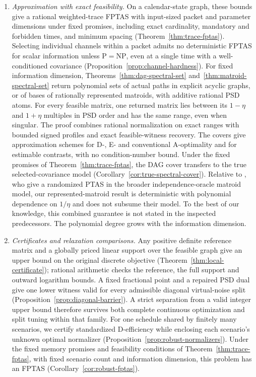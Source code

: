 \begin{enumerate}
\item \emph{Approximation with exact feasibility.} On a calendar-state graph,
these bounds give a rational weighted-trace FPTAS with input-sized packet
and parameter dimensions under fixed promises, including exact cardinality,
mandatory and forbidden times, and minimum spacing
(Theorem~\ref{thm:trace-fptas}). Selecting individual channels within a
packet admits no deterministic FPTAS for scalar information unless
$\mathrm P=\mathrm{NP}$, even at a single time with a well-conditioned
covariance (Proposition~\ref{prop:channel-hardness}). For fixed information
dimension, Theorems~\ref{thm:dag-spectral-set} and~\ref{thm:matroid-spectral-set}
return polynomial sets of actual paths in explicit acyclic graphs, or of
bases of rationally represented matroids, with additive rational PSD atoms.
For every feasible matrix, one returned matrix lies between its $1-\eta$ and
$1+\eta$ multiples in PSD order and has the same range, even when singular.
The proof combines rational normalization on exact ranges with bounded
signed profiles and exact feasible-witness recovery. The covers give
approximation schemes for D-, E- and conventional A-optimality and for
estimable contrasts, with no condition-number bound. Under the fixed
promises of Theorem~\ref{thm:trace-fptas}, the DAG cover transfers to the
true selected-covariance model (Corollary~\ref{cor:true-spectral-cover}).
Relative to \citet{Brown2024}, who give a randomized PTAS in the broader
independence-oracle matroid model, our represented-matroid result is
deterministic with polynomial dependence on $1/\eta$ and does not subsume
their model. To the best of our knowledge, this combined guarantee is not
stated in the inspected predecessors. The polynomial degree grows with the
information dimension.

\item \emph{Certificates and relaxation comparisons.} Any positive definite
reference matrix and a globally priced linear support over the feasible
graph give an upper bound on the original discrete objective
(Theorem~\ref{thm:local-certificate}); rational arithmetic checks the
reference, the full support and outward logarithm bounds. A fixed fractional
point and a repaired PSD dual give one lower witness valid for every
admissible diagonal virtual-noise split
(Proposition~\ref{prop:diagonal-barrier}).
A strict separation from a valid integer upper bound therefore survives both
complete continuous optimization and split tuning within that family. For
one schedule shared by finitely many scenarios, we certify standardized
D-efficiency while enclosing each scenario's unknown optimal normalizer
(Proposition~\ref{prop:robust-normalizers}). Under the fixed memory
promises and feasibility conditions of Theorem~\ref{thm:trace-fptas}, with
fixed scenario count and information dimension, this problem has an FPTAS
(Corollary~\ref{cor:robust-fptas}).


\end{enumerate}
